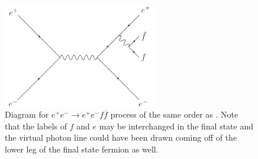 \begin{figure}[H]
\begin{center}
    \includegraphics[width=0.6\textwidth]{prob3/prob3.pdf}    
\end{center}
\caption{Diagram for $e^{+}e^{-} \rightarrow e^{+}e^{-}f\overline{f}$ process of the same order as . Note that the labels of $f$ and $e$ may be interchanged in the final state and the virtual photon line could have been drawn coming off of the lower leg of the final state fermion as well.}
\label{fig:prob3-same-order}
\end{figure}





